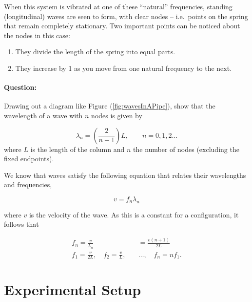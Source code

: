 When this system is vibrated at one of these ``natural'' frequencies, standing (longitudinal) waves are seen to form, with clear nodes -- i.e.\ points on the spring that remain completely stationary. Two important points can be noticed about the nodes in this case:

\begin{enumerate}[label=(\alph*)]
    \item They divide the length of the spring into equal parts.
    \item They increase by 1 as you move from one natural frequency to the next.
\end{enumerate}

\begin{question}
\paragraph{Question:} Drawing out a diagram like Figure (\ref{fig:wavesInAPipe}), show that the wavelength of a wave with $n$ nodes is given by

\begin{equation}
    \lambda_n = \left(\frac{2}{n+1}\right) L , \quad \quad n=0,1,2\hdots
\end{equation}
where $L$ is the length of the column and $n$ the number of nodes (excluding the fixed endpoints).
\end{question}


We know that waves satisfy the following equation that relates their wavelengths and frequencies, 

\begin{equation}
    v = f_n \lambda_n
\end{equation}

where $v$ is the velocity of the wave. As this is a constant for a configuration, it follows that 

\begin{equation}
\begin{aligned}
f_n = \frac{v}{\lambda_n} &= \frac{v (n+1)}{2L}\\
f_1 = \frac{v}{2L}, \quad f_2 = \frac{v}{L},\quad &\hdots,\quad f_n = n f_1.
\end{aligned}
\end{equation}



\section*{Experimental Setup}

